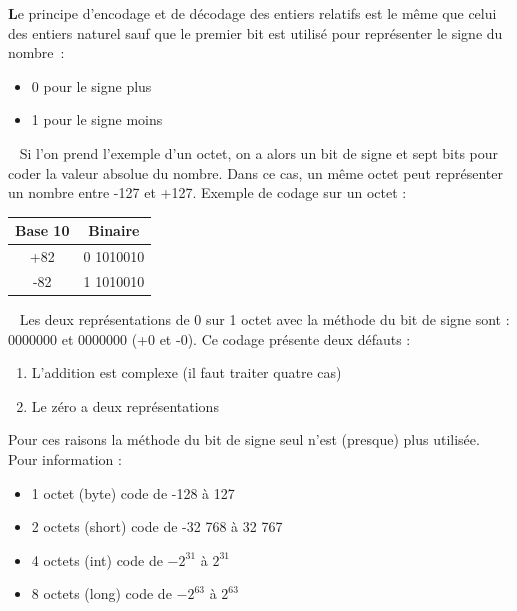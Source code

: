 \documentclass{article}
\begin{document}
\newpage
\textbf{L}e principe d'encodage et de d\'ecodage des entiers relatifs est le m\^eme que celui des entiers naturel sauf que le premier bit est utilis\'e pour repr\'esenter le signe du nombre~\cite{Entier_relatif}: 
\begin{itemize}
\item 0 pour le signe plus
\item 1 pour le signe moins
\end{itemize} 
~\newline
Si l'on prend l'exemple d'un octet, on a alors un bit de signe et sept bits pour coder la valeur absolue du nombre. Dans ce cas, un m\^eme octet peut repr\'esenter un nombre entre -127 et +127.\newline
\newline Exemple de codage sur un octet :
\begin{center}
\begin{tabular}{c|c}
Base 10 & Binaire\\
\hline
+82 &   0 1010010\\
-82 &  1  1010010\\
\end{tabular}
\end{center}
~\newline
Les deux repr\'esentations de 0 sur 1 octet avec la m\'ethode du bit de signe  sont :   0000000 \fg{} et   0000000 \fg{} (+0 et -0). Ce codage pr\'esente deux d\'efauts :
\begin{enumerate}
\item L'addition est complexe (il faut traiter quatre cas)
\item Le z\'ero a deux repr\'esentations 
\end{enumerate}
Pour ces raisons la m\'ethode du bit de signe seul n'est (presque) plus utilis\'ee.\newline
\newline Pour information :
\begin{itemize}
\item 1 octet (byte) code de -128 \`a 127
\item 2 octets (short) code de -32 768 \`a 32 767 
\item 4 octets (int) code de  $-2^{31}$ \`a $2^{31}$ 
\item 8 octets (long) code de $-2^{63}$ \`a $2^{63}$ 
\end{itemize}

\end{document}
